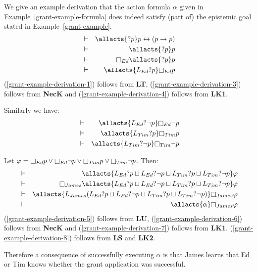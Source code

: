 \begin{example}\label{grant-example-derivation}
We give an example derivation that the action formula $\alpha$ given in Example~\ref{grant-example-formula} does indeed satisfy (part of) the epistemic goal stated in Example~\ref{grant-example}.
\begin{eqnarray}
    &\proves& \allacts{\test{\atomP}} \atomP \iff (\atomP \implies \atomP)\label{grant-example-derivation-1}\\
    &\proves& \allacts{\test{\atomP}} \atomP\label{grant-example-derivation-2}\\
    &\proves& \necessary[Ed] \allacts{\test{\atomP}} \atomP\label{grant-example-derivation-3}\\
    &\proves& \allacts{\learns_{Ed} \test{\atomP}} \necessary[Ed] \atomP\label{grant-example-derivation-4}
\end{eqnarray}
(\ref{grant-example-derivation-1}) follows from {\bf LT},
(\ref{grant-example-derivation-3}) follows from {\bf NecK} and
(\ref{grant-example-derivation-4}) follows from {\bf LK1}.

Similarly we have:
\begin{eqnarray*}
    &\proves& \allacts{\learns_{Ed} \test{\neg \atomP}} \necessary[Ed] \neg \atomP\\
    &\proves& \allacts{\learns_{Tim} \test{\atomP}} \necessary[Tim] \atomP\\
    &\proves& \allacts{\learns_{Tim} \test{\neg \atomP}} \necessary[Tim] \neg \atomP
\end{eqnarray*}

Let $\phi = \necessary[Ed] \atomP \lor  \necessary[Ed] \neg \atomP \lor \necessary[Tim] \atomP \lor \necessary[Tim] \neg \atomP$. Then:
\begin{eqnarray}
    &\proves& \allacts{\learns_{Ed} \test{\atomP} \choice \learns_{Ed} \test{\neg \atomP} \choice \learns_{Tim} \test{\atomP} \choice \learns_{Tim} \test{\neg \atomP}} \phi\label{grant-example-derivation-5}\\
    &\proves& \necessary[James] \allacts{\learns_{Ed} \test{\atomP} \choice \learns_{Ed} \test{\neg \atomP} \choice \learns_{Tim} \test{\atomP} \choice \learns_{Tim} \test{\neg \atomP}} \phi\label{grant-example-derivation-6}\\
    &\proves& \allacts{\learns_{James} (\learns_{Ed} \test{\atomP} \choice \learns_{Ed} \test{\neg \atomP} \choice \learns_{Tim} \test{\atomP} \choice \learns_{Tim} \test{\neg \atomP})} \necessary[James] \phi\label{grant-example-derivation-7}\\
    &\proves& \allacts{\alpha} \necessary[James] \phi\label{grant-example-derivation-8}
\end{eqnarray}
(\ref{grant-example-derivation-5}) follows from {\bf LU},
(\ref{grant-example-derivation-6}) follows from {\bf NecK} and
(\ref{grant-example-derivation-7}) follows from {\bf LK1}.
(\ref{grant-example-derivation-8}) follows from {\bf LS} and {\bf LK2}.

Therefore a consequence of successfully executing $\alpha$ is that James learns that Ed or Tim knows whether the grant application was successful.
\end{example}

